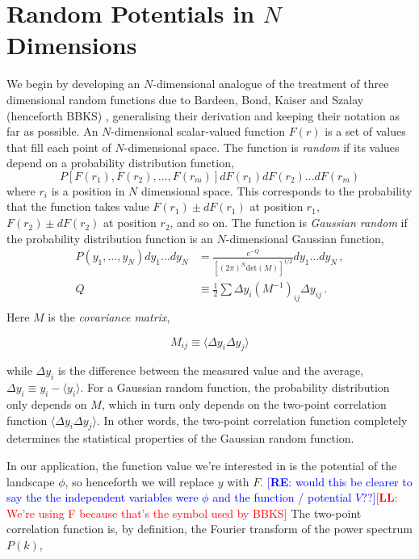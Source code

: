 \documentclass[12pt]{article}
\newcommand{\re}[1]{\textcolor{blue}{[{\bf RE}: #1]}}
\newcommand{\lfl}[1]{\textcolor{red}{[{\bf LL}: #1]}}
\begin{document}
\section{Random Potentials in $N$ Dimensions}

We begin by developing an $N$-dimensional analogue of the treatment of three dimensional random functions due to Bardeen, Bond, Kaiser and Szalay (henceforth BBKS) \cite{BBKS}, generalising their derivation and keeping their notation as far as possible.   An $N$-dimensional scalar-valued function $F(r)$ is a set of values that fill each point of $N$-dimensional space. The function is \emph{random} if its values depend on a probability distribution function,
%
\begin{equation}
P[F(r_1), F(r_2), \ldots, F(r_m)]dF(r_1)dF(r_2)\ldots dF(r_m)
\end{equation}
%
\noindent where $r_i$ is a position in $N$ dimensional space. This corresponds to the probability that the function takes value $F(r_1) \pm dF(r_1)$ at position $r_1$, $F(r_2) \pm dF(r_2)$ at position $r_2$, and so on. 
%
The function is \emph{Gaussian random} if the probability distribution function is an $N$-dimensional Gaussian function,
%
\begin{equation} \label{MultivariateGaussian}
\begin{split}
P(y_1,\ldots,y_N)dy_1\ldots dy_N &= \frac{e^{-Q}}{[(2\pi)^N \mathrm{det}(M)]^{1/2}} dy_1\ldots dy_N \, ,\\
Q &\equiv \frac{1}{2} \sum \Delta y_i (M^{-1})_{ij} \Delta y_{ij} \, .\\
\end{split}
\end{equation}
%
Here $M$ is the \emph{covariance matrix}, 

\begin{equation}
M_{ij} \equiv \langle \Delta y_i \Delta y_j \rangle
\end{equation}

\noindent while $\Delta y_i$ is the difference between the measured value and the average, $\Delta y_i \equiv y_i - \langle y_i \rangle$. For a Gaussian random function, the probability distribution only depends on $M$, which in turn only depends on the two-point correlation function $\langle \Delta y_i \Delta y_j \rangle$. In other words, the two-point correlation function completely determines the statistical properties of the Gaussian random function.

In our application, the function value we're interested in is the potential of the landscape $\phi$, so henceforth we will replace $y$ with $F$. \re{would this be clearer to say the the independent variables were $\phi$ and the function / potential $V$??}\lfl{We're using F because that's the symbol used by BBKS} The two-point correlation function is, by definition, the Fourier transform of the power spectrum $P(k)$,
\end{document}
